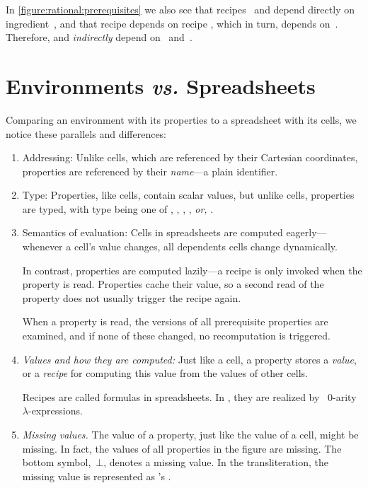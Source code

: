 In \cref{figure:rational:prerequisites} we also see that recipes~ and
 depend directly on ingredient~, and that recipe 
depends on recipe , which in turn, depends on~.  Therefore,
 and  \emph{indirectly} depend on~ and~.


\section{Environments \emph{vs.} Spreadsheets}
Comparing an environment with its properties to a spreadsheet with its cells,
we notice these parallels and differences:

\begin{enumerate}
  \item{Addressing:} Unlike cells, which are referenced by their Cartesian coordinates,
  properties are referenced by their \emph{name}---a plain identifier.

  \item{Type:} Properties, like cells, contain scalar values, but unlike cells,
  properties are typed, with type being one of , ,
  , , \emph{or,} .

  \item{Semantics of evaluation:} Cells in spreadsheets are computed
  eagerly---whenever a cell's value changes, all dependents cells change
  dynamically.

  In contrast, properties are computed lazily---a recipe is only invoked
  when the property is read. Properties cache their value, so a second read
  of the property does not usually trigger the recipe again.

  When a property is read, the versions of all prerequisite
  properties are examined, and if none of these changed, no recomputation is
  triggered.

  \item\emph{Values and how they are computed:} Just like a cell, a property
  stores a \emph{value}, or a \emph{recipe} for computing this value from the
  values of other cells.

  Recipes are called formulas in spreadsheets. In \Reap, they are realized
  by \Java~$0$-arity~$λ$-expressions.

  \item\emph{Missing values.} The value of a property, just like the value
  of a cell, might be missing. In fact, the values of all properties in
  the figure are missing. The bottom symbol,~$⊥$, denotes a missing value.
  In the transliteration, the missing value is represented as \Java's
  .


\end{enumerate}
